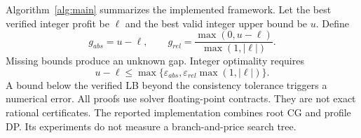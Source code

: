 Algorithm~\ref{alg:main} summarizes the implemented framework. Let the best verified integer profit be $\ell$ and the best valid integer upper bound be $u$. Define
\begin{equation}
g_{abs}=u-\ell,\qquad
g_{rel}=\frac{\max(0,u-\ell)}{\max(1,|\ell|)}.\label{eq:gap}
\end{equation}
Missing bounds produce an unknown gap. Integer optimality requires
\begin{equation}
u-\ell\leq\max\{\varepsilon_{abs},\varepsilon_{rel}\max(1,|\ell|)\}.\label{eq:closure}
\end{equation}
A bound below the verified LB beyond the consistency tolerance triggers a numerical error. All proofs use solver floating-point contracts. They are not exact rational certificates. The reported implementation combines root CG and profile DP. Its experiments do not measure a branch-and-price search tree.
